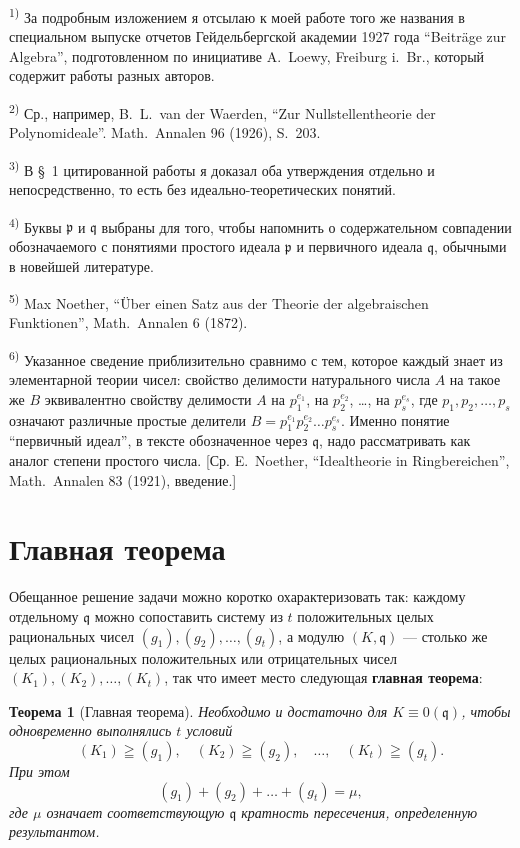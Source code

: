 \documentclass[11pt]{article}
\newcommand{\foreign}[1]{#1}
\theoremstyle{plain}
\newtheorem{satz}{Теорема}
\begin{document}
{\footnotesize
\textsuperscript{1)} За подробным изложением я отсылаю к моей работе того же
названия в специальном выпуске отчетов Гейдельбергской академии 1927 года
``Beiträge zur Algebra'', подготовленном по инициативе A.\ Loewy,
Freiburg i.\ Br., который содержит работы разных авторов.

\textsuperscript{2)} Ср., например, B.\ L.\ van der Waerden, ``Zur Nullstellentheorie der Polynomideale''.
\foreign{Math.\ Annalen} 96 (1926), S.~203.

\textsuperscript{3)} В \S~1 цитированной работы я доказал оба утверждения
отдельно и непосредственно, то есть без идеально-теоретических понятий.

\textsuperscript{4)} Буквы $\mathfrak{p}$ и $\mathfrak{q}$ выбраны для того,
чтобы напомнить о содержательном совпадении обозначаемого с понятиями
простого идеала $\mathfrak{p}$ и первичного идеала $\mathfrak{q}$, обычными
в новейшей литературе.

\textsuperscript{5)} Max Noether, ``Über einen Satz aus der Theorie der algebraischen Funktionen'',
\foreign{Math.\ Annalen} 6 (1872).

\textsuperscript{6)} Указанное сведение приблизительно сравнимо с тем, которое
каждый знает из элементарной теории чисел: свойство делимости натурального
числа $A$ на такое же $B$ эквивалентно свойству делимости $A$ на
$p_{1}^{e_{1}}$, на $p_{2}^{e_{2}}$, \ldots, на $p_{s}^{e_{s}}$, где
$p_{1}, p_{2}, \ldots, p_{s}$ означают различные простые делители
$B = p_{1}^{e_{1}}p_{2}^{e_{2}} \ldots p_{s}^{e_{s}}$. Именно понятие
``первичный идеал'', в тексте обозначенное через $\mathfrak{q}$, надо
рассматривать как аналог степени простого числа. [Ср. E.\ Noether,
``Idealtheorie in Ringbereichen'', \foreign{Math.\ Annalen} 83 (1921), введение.]
}

\newpage
\section*{Главная теорема}

Обещанное решение задачи можно коротко охарактеризовать так:
каждому отдельному $\mathfrak{q}$ можно сопоставить систему из $t$
положительных целых рациональных чисел
$(g_{1}), (g_{2}), \ldots, (g_{t})$, а модулю $(K, \mathfrak{q})$ ---
столько же целых рациональных положительных или отрицательных чисел
$(K_{1}), (K_{2}), \ldots, (K_{t})$, так что имеет место следующая
\textbf{главная теорема}:

\begin{satz}[Главная теорема]\label{satz:kap-II}
Необходимо и достаточно для $K \equiv 0(\mathfrak{q})$, чтобы
одновременно выполнялись $t$ условий
\[
(K_1)\geqq(g_1),\quad (K_2)\geqq(g_2),\quad \ldots,\quad (K_t)\geqq(g_t).
\]
При этом
\[
(g_1)+(g_2)+\ldots+(g_t)=\mu,
\]
где $\mu$ означает соответствующую $\mathfrak{q}$ кратность
пересечения, определенную результантом.
\end{satz}
\end{document}

